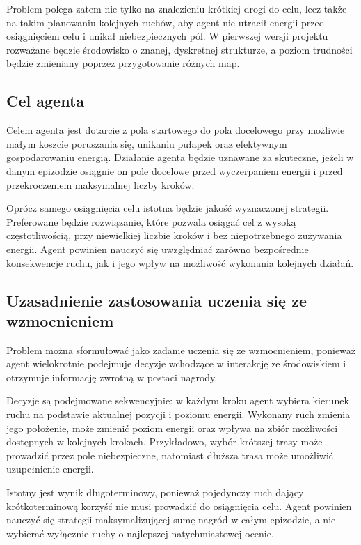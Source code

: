 \documentclass[12pt]{article}
\begin{document}
Problem polega zatem nie tylko na znalezieniu krótkiej drogi do celu, lecz także na takim planowaniu kolejnych ruchów, aby agent nie utracił energii przed osiągnięciem celu i unikał niebezpiecznych pól. W pierwszej wersji projektu rozważane będzie środowisko o znanej, dyskretnej strukturze, a poziom trudności będzie zmieniany poprzez przygotowanie różnych map.

\subsection{Cel agenta}

Celem agenta jest dotarcie z pola startowego do pola docelowego przy możliwie małym koszcie poruszania się, unikaniu pułapek oraz efektywnym gospodarowaniu energią. Działanie agenta będzie uznawane za skuteczne, jeżeli w danym epizodzie osiągnie on pole docelowe przed wyczerpaniem energii i przed przekroczeniem maksymalnej liczby kroków.

Oprócz samego osiągnięcia celu istotna będzie jakość wyznaczonej strategii. Preferowane będzie rozwiązanie, które pozwala osiągać cel z wysoką częstotliwością, przy niewielkiej liczbie kroków i bez niepotrzebnego zużywania energii. Agent powinien nauczyć się uwzględniać zarówno bezpośrednie konsekwencje ruchu, jak i jego wpływ na możliwość wykonania kolejnych działań.

\subsection{Uzasadnienie zastosowania uczenia się ze wzmocnieniem}

Problem można sformułować jako zadanie uczenia się ze wzmocnieniem, ponieważ agent wielokrotnie podejmuje decyzje wchodzące w interakcję ze środowiskiem i otrzymuje informację zwrotną w postaci nagrody.

Decyzje są podejmowane sekwencyjnie: w każdym kroku agent wybiera kierunek ruchu na podstawie aktualnej pozycji i poziomu energii. Wykonany ruch zmienia jego położenie, może zmienić poziom energii oraz wpływa na zbiór możliwości dostępnych w kolejnych krokach. Przykładowo, wybór krótszej trasy może prowadzić przez pole niebezpieczne, natomiast dłuższa trasa może umożliwić uzupełnienie energii.

Istotny jest wynik długoterminowy, ponieważ pojedynczy ruch dający krótkoterminową korzyść nie musi prowadzić do osiągnięcia celu. Agent powinien nauczyć się strategii maksymalizującej sumę nagród w całym epizodzie, a nie wybierać wyłącznie ruchy o najlepszej natychmiastowej ocenie.
\end{document}

